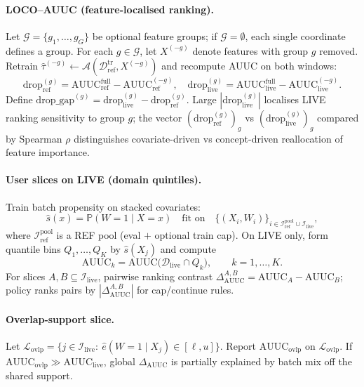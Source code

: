 \paragraph{LOCO--AUUC (feature-localised ranking).}
Let $\mathcal{G}=\{g_1,\ldots,g_G\}$ be optional feature groups; if $\mathcal{G}=\emptyset$, each single coordinate defines a group.
For each $g\in\mathcal{G}$, let $X^{(-g)}$ denote features with group $g$ removed.
Retrain $\hat\tau^{(-g)} \leftarrow \mathcal{A}(\mathcal{D}_{\mathrm{ref}}^{\mathrm{tr}}, X^{(-g)})$ and recompute AUUC on both windows:
\[
  \mathrm{drop}_{\mathrm{ref}}^{(g)}
  = \mathrm{AUUC}_{\mathrm{ref}}^{\mathrm{full}} - \mathrm{AUUC}_{\mathrm{ref}}^{(-g)},\quad
  \mathrm{drop}_{\mathrm{live}}^{(g)}
  = \mathrm{AUUC}_{\mathrm{live}}^{\mathrm{full}} - \mathrm{AUUC}_{\mathrm{live}}^{(-g)}.
\]
Define $\mathrm{drop\_gap}^{(g)}=\mathrm{drop}_{\mathrm{live}}^{(g)}-\mathrm{drop}_{\mathrm{ref}}^{(g)}$.
Large $|\mathrm{drop}_{\mathrm{live}}^{(g)}|$ localises LIVE ranking sensitivity to group $g$;
the vector $(\mathrm{drop}_{\mathrm{ref}}^{(g)})_g$ vs $(\mathrm{drop}_{\mathrm{live}}^{(g)})_g$ compared by Spearman $\rho$ distinguishes covariate-driven vs concept-driven reallocation of feature importance.

\paragraph{User slices on LIVE (domain quintiles).}
Train batch propensity on stacked covariates:
\[
  \hat s(x) = \mathbb P(W=1\mid X=x)
  \quad\text{fit on}\quad
  \{(X_i,W_i)\}_{i\in\mathcal{I}_{\mathrm{ref}}^{\mathrm{pool}}\cup\mathcal{I}_{\mathrm{live}}},
\]
where $\mathcal{I}_{\mathrm{ref}}^{\mathrm{pool}}$ is a REF pool (eval $+$ optional train cap).
On LIVE only, form quantile bins $Q_1,\ldots,Q_K$ by $\hat s(X_j)$ and compute
\[
  \mathrm{AUUC}_k = \mathrm{AUUC}\bigl(\mathcal{D}_{\mathrm{live}}\cap Q_k\bigr),\qquad k=1,\ldots,K.
\]
For slices $A,B\subseteq\mathcal{I}_{\mathrm{live}}$, pairwise ranking contrast
$\Delta_{\mathrm{AUUC}}^{A,B}=\mathrm{AUUC}_A-\mathrm{AUUC}_B$; policy ranks pairs by $|\Delta_{\mathrm{AUUC}}^{A,B}|$ for cap/continue rules.

\paragraph{Overlap-support slice.}
Let $\mathcal{L}_{\mathrm{ovlp}}=\{j\in\mathcal{I}_{\mathrm{live}}:\ \hat e(W=1\mid X_j)\in[\ell,u]\}$.
Report $\mathrm{AUUC}_{\mathrm{ovlp}}$ on $\mathcal{L}_{\mathrm{ovlp}}$.
If $\mathrm{AUUC}_{\mathrm{ovlp}}\gg \mathrm{AUUC}_{\mathrm{live}}$, global $\Delta_{\mathrm{AUUC}}$ is partially explained by batch mix off the shared support.

